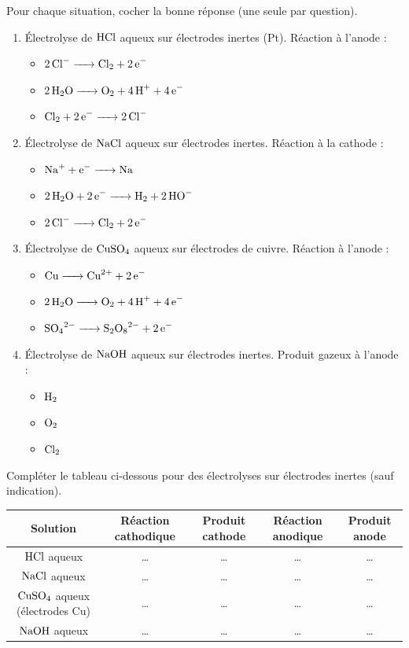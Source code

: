 \documentclass[11pt]{article}
\begin{document}
\begin{exercice}
Pour chaque situation, cocher la bonne réponse (une seule par question).
\begin{enumerate}
    \item Électrolyse de $\ce{HCl}$ aqueux sur électrodes inertes (Pt). Réaction à l'anode :
    \begin{itemize}
        \item $\ce{2Cl- -> Cl2 + 2e-}$
        \item $\ce{2H2O -> O2 + 4H+ + 4e-}$
        \item $\ce{Cl2 + 2e- -> 2Cl-}$
    \end{itemize}
    \item Électrolyse de $\ce{NaCl}$ aqueux sur électrodes inertes. Réaction à la cathode :
    \begin{itemize}
        \item $\ce{Na+ + e- -> Na}$
        \item $\ce{2H2O + 2e- -> H2 + 2HO-}$
        \item $\ce{2Cl- -> Cl2 + 2e-}$
    \end{itemize}
    \item Électrolyse de $\ce{CuSO4}$ aqueux sur électrodes de cuivre. Réaction à l'anode :
    \begin{itemize}
        \item $\ce{Cu -> Cu^2+ + 2e-}$
        \item $\ce{2H2O -> O2 + 4H+ + 4e-}$
        \item $\ce{SO4^2- -> S2O8^2- + 2e-}$
    \end{itemize}
    \item Électrolyse de $\ce{NaOH}$ aqueux sur électrodes inertes. Produit gazeux à l'anode :
    \begin{itemize}
        \item $\ce{H2}$
        \item $\ce{O2}$
        \item $\ce{Cl2}$
    \end{itemize}
\end{enumerate}
\end{exercice}

\begin{exercice}
Compléter le tableau ci-dessous pour des électrolyses sur électrodes inertes (sauf indication).

\begin{tabular}{|c|c|c|c|c|}
\hline
\textbf{Solution} & \textbf{Réaction cathodique} & \textbf{Produit cathode} & \textbf{Réaction anodique} & \textbf{Produit anode} \\
\hline
$\ce{HCl}$ aqueux & \ldots & \ldots & \ldots & \ldots \\
\hline
$\ce{NaCl}$ aqueux & \ldots & \ldots & \ldots & \ldots \\
\hline
$\ce{CuSO4}$ aqueux (électrodes Cu) & \ldots & \ldots & \ldots & \ldots \\
\hline
$\ce{NaOH}$ aqueux & \ldots & \ldots & \ldots & \ldots \\
\hline
\end{tabular}
\end{exercice}
\end{document}
